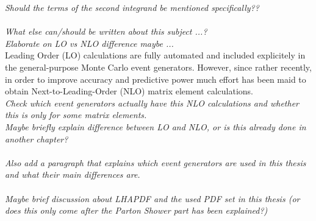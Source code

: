 \textit{Should the terms of the second integrand be mentioned specifically??}\\
\\
\textit{What else can/should be written about this subject ...?}\\
\textit{Elaborate on LO vs NLO difference maybe ...}\\
Leading Order (LO) calculations are fully automated and included explicitely in the general-purpose Monte Carlo event generators. However, since rather recently, in order to improve accuracy and predictive power much effort has been maid to obtain Next-to-Leading-Order (NLO) matrix element calculations.\\
\textit{Check which event generators actually have this NLO calculations and whether this is only for some matrix elements.}\\
\textit{Maybe briefly explain difference between LO and NLO, or is this already done in another chapter?}\\
\\
\textit{Also add a paragraph that explains which event generators are used in this thesis and what their main differences are.}\\
\\
\textit{Maybe brief discussion about LHAPDF and the used PDF set in this thesis (or does this only come after the Parton Shower part has been explained?)}

